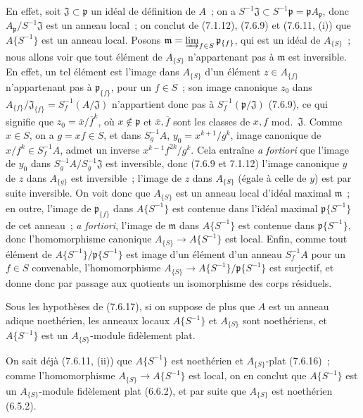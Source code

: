 En effet, soit $\mathfrak J\subset\mathfrak p$ un idéal de définition de
$A$~; on a $S^{-1}\mathfrak J\subset S^{-1}\mathfrak p=\mathfrak p
A_{\mathfrak p}$, donc $A_{\mathfrak p}/S^{-1}\mathfrak J$ est un anneau
local~; on conclut de (7.1.12), (7.6.9) et (7.6.11, (i)) que
$A\{S^{-1}\}$ est un anneau local. Posons
$\mathfrak m=\varinjlim_{f\in S}\mathfrak p_{\{f\}}$, qui est un idéal de
$A_{\{S\}}$~; nous allons voir que tout élément de $A_{\{S\}}$ n'appartenant
pas à $\mathfrak m$ est inversible. En effet, un tel élément est l'image dans
$A_{\{S\}}$ d'un élément $z\in A_{\{f\}}$ n'appartenant pas à
$\mathfrak p_{\{f\}}$, pour un $f\in S$~; son image canonique $z_0$ dans
$A_{\{f\}}/\mathfrak J_{\{f\}}=S_f^{-1}(A/\mathfrak J)$ n'appartient donc
pas à $S_f^{-1}(\mathfrak p/\mathfrak J)$ (7.6.9), ce qui signifie que
$z_0=\overline{x}/\overline{f}^k$, où $x\notin\mathfrak p$ et
$\overline{x},\overline{f}$ sont les classes de $x,f$ mod.~$\mathfrak J$.
Comme $x\in S$, on a $g=xf\in S$, et dans $S_g^{-1}A$,
$y_0=x^{k+1}/g^k$, image canonique de $x/f^k\in S_f^{-1}A$, admet un
inverse $x^{k-1}f^{2k}/g^k$. Cela entraîne \emph{a fortiori} que l'image de
$y_0$ dans $S_g^{-1}A/S_g^{-1}\mathfrak J$ est inversible, donc (7.6.9 et
7.1.12) l'image canonique $y$ de $z$ dans $A_{\{g\}}$ est inversible~;
l'image de $z$ dans $A_{\{S\}}$ (égale à celle de $y$) est par suite
inversible. On voit donc que $A_{\{S\}}$ est un anneau local d'idéal maximal
$\mathfrak m$~; en outre, l'image de $\mathfrak p_{\{f\}}$ dans
$A\{S^{-1}\}$ est contenue dans l'idéal maximal $\mathfrak p\{S^{-1}\}$ de
cet anneau~; \emph{a fortiori}, l'image de $\mathfrak m$ dans
$A\{S^{-1}\}$ est contenue dans $\mathfrak p\{S^{-1}\}$, donc
l'homomorphisme canonique $A_{\{S\}}\to A\{S^{-1}\}$ est local. Enfin,
comme tout élément de $A\{S^{-1}\}/\mathfrak p\{S^{-1}\}$ est image d'un
élément d'un anneau $S_f^{-1}A$ pour un $f\in S$ convenable,
l'homomorphisme $A_{\{S\}}\to A\{S^{-1}\}/\mathfrak p\{S^{-1}\}$ est
surjectif, et donne donc par passage aux quotients un isomorphisme des corps
résiduels.

\begin{corollary}[7.6.18]
\label{0.7.6.18-fr}
Sous les hypothèses de (7.6.17), si on suppose de plus que $A$ est un anneau
adique noethérien, les anneaux locaux $A\{S^{-1}\}$ et $A_{\{S\}}$ sont
noethériens, et $A\{S^{-1}\}$ est un $A_{\{S\}}$-module fidèlement plat.
\end{corollary}

On sait déjà (7.6.11, (ii)) que $A\{S^{-1}\}$ est noethérien et
$A_{\{S\}}$-plat (7.6.16)~; comme l'homomorphisme
$A_{\{S\}}\to A\{S^{-1}\}$ est local, on en conclut que $A\{S^{-1}\}$ est
un $A_{\{S\}}$-module fidèlement plat (6.6.2), et par suite que $A_{\{S\}}$
est noethérien (6.5.2).

